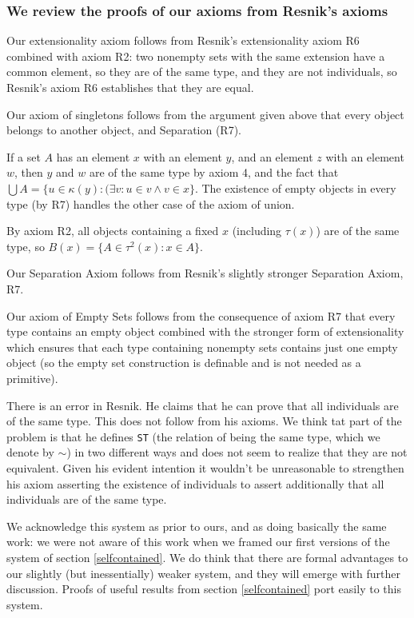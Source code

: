 \documentclass[12pt]{article}
\begin{document}
\subsubsection*{We review the proofs of our axioms from Resnik's axioms}


Our extensionality axiom follows from Resnik's extensionality axiom R6
combined with axiom R2: two nonempty sets with the same extension have
a common element, so they are of the same type, and they are not
individuals, so Resnik's axiom R6 establishes that they are equal.

Our axiom of singletons follows from the argument given above that every object belongs to another object, and Separation (R7).

If a set $A$ has an element $x$ with an element $y$, and an element $z$ with an element $w$, then $y$ and $w$ are of the same type by axiom 4, and the fact that \mbox{$\bigcup A = \{u \in \kappa(y):(\exists v:u \in v \wedge v \in x\}$.}  The existence of empty objects in every type (by R7) handles the other case of the axiom of union.

By axiom R2, all objects containing a fixed $x$ (including $\tau(x)$) are of the same type, so $B(x)= \{A \in \tau^2(x):x \in A\}$.

Our Separation Axiom follows from Resnik's slightly stronger Separation Axiom, R7.

Our axiom of Empty Sets follows from the consequence of axiom R7 that every type contains an empty object combined with the stronger form of extensionality which ensures that each type containing nonempty sets contains just one empty object (so the empty set construction is definable and is not needed as a primitive).

There is an error in Resnik.  He claims that he can prove that all individuals are of the same type.  This does not follow from his axioms.  We think tat part of the problem is that he defines {\tt ST} (the relation of being the same type, which we denote by $\sim$) in two different ways and does not seem to realize that they are not equivalent.  Given his evident intention it wouldn't be unreasonable to strengthen  his axiom asserting the existence of individuals to assert additionally that all individuals are of the same type.

We acknowledge this system as prior to ours, and as doing basically the same work:  we were not aware of this work when we framed our first versions of the system of  section \ref{selfcontained}.   We do think that there are formal advantages to our slightly (but inessentially) weaker system, and they will emerge with further discussion.  Proofs of useful results from  section \ref{selfcontained} port easily to this system.  
\end{document}
